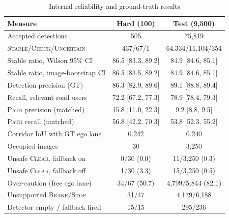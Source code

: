 \begin{table}[t]
\centering
\caption{Internal reliability and ground-truth results}
\label{tab:overall}
\footnotesize
\setlength{\tabcolsep}{3pt}
\begin{tabular}{lcc}
\hline
Measure & Hard (100) & Test (9{,}500) \\
\hline
Accepted detections & 505 & 75{,}819 \\
\textsc{Stable}/\textsc{Check}/\textsc{Uncertain} & 437/67/1 & 64{,}334/11{,}104/354 \\
Stable ratio, Wilson 95\% CI & 86.5 [83.3, 89.2] & 84.9 [84.6, 85.1] \\
Stable ratio, image-bootstrap CI & 86.5 [83.5, 89.2] & 84.9 [84.6, 85.1] \\
\hline
Detection precision (GT) & 86.3 [82.9, 89.6] & 89.1 [88.8, 89.4] \\
Recall, relevant road users & 72.2 [67.2, 77.3] & 78.9 [78.4, 79.3] \\
\textsc{Path} precision (matched) & 15.8 [11.0, 22.3] & 9.2 [8.8, 9.5] \\
\textsc{Path} recall (matched) & 56.8 [42.2, 70.3] & 53.8 [52.3, 55.2] \\
Corridor IoU with GT ego lane & 0.242 & 0.240 \\
\hline
Occupied images & 30 & 3{,}250 \\
Unsafe \textsc{Clear}, fallback on & 0/30 (0.0) & 11/3{,}250 (0.3) \\
Unsafe \textsc{Clear}, fallback off & 1/30 (3.3) & 15/3{,}250 (0.5) \\
Over-caution (free ego lane) & 34/67 (50.7) & 4{,}799/5{,}844 (82.1) \\
Unsupported \textsc{Brake}/\textsc{Stop} & 31/47 & 4{,}179/6{,}188 \\
Detector-empty / fallback fired & 15/15 & 295/236 \\
\hline
\end{tabular}
\end{table}
